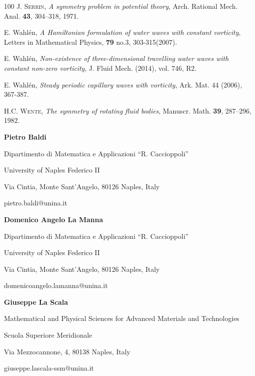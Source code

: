 \documentclass[10pt,reqno,a4paper]{article}
\numberwithin{equation}{section}
\theoremstyle{plain}
\theoremstyle{definition}
\begin{document}
\begin{thebibliography}{100}
 \textsc{J. Serrin}, \textit{A symmetry problem in potential theory},  Arch. Rational Mech. Anal. {\bf 43}, 304–318, 1971.

 {\sc E. Wahlén}, \emph{A Hamiltonian formulation of water waves with constant vorticity}, Letters in
Mathematical Physics, \textbf{79} no.3, 303-315(2007).

 {\sc E. Wahlén}, \emph{Non-existence of three-dimensional travelling water waves with constant non-zero vorticity}, J. Fluid Mech. (2014), vol. 746, R2.

 {\sc E. Wahlén}, \emph{Steady periodic capillary waves with vorticity}, Ark. Mat. 44 (2006), 367-387.

 \textsc{H.C. Wente}, \textit{The symmetry of rotating fluid bodies}, Manuscr. Math. {\bf 39}, 287–296, 1982.


\end{thebibliography}


\bigskip

\begin{flushright}

\textbf{Pietro Baldi}

Dipartimento di Matematica e Applicazioni ``R. Caccioppoli''

University of Naples Federico II

Via Cintia, Monte Sant'Angelo, 80126 Naples, Italy

pietro.baldi@unina.it

\medskip



\textbf{Domenico Angelo La Manna}

Dipartimento di Matematica e Applicazioni ``R. Caccioppoli''

University of Naples Federico II

Via Cintia, Monte Sant'Angelo, 80126 Naples, Italy

domenicoangelo.lamanna@unina.it

\medskip

\textbf{Giuseppe La Scala}

Mathematical and Physical Sciences for Advanced Materials and Technologies

Scuola Superiore Meridionale

Via Mezzocannone, 4, 80138 Naples, Italy

giuseppe.lascala-ssm@unina.it

\end{flushright}
\end{document}
